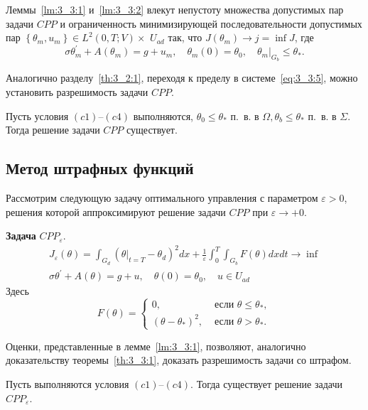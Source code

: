 Леммы~\ref{lm:3_3:1} и~\ref{lm:3_3:2} влекут
непустоту множества допустимых пар задачи $CPP$
и ограниченность минимизирующей последовательности допустимых пар
$\left\{\theta_{m}, u_{m}\right\} \in L^{2}(0, T ; V) \times$
$U_{a d}$ так, что $J\left(\theta_{m}\right) \rightarrow j=\inf J$, где
\begin{equation}
    \label{eq:3_3:5}
    \sigma \theta_{m}^{\prime}+A\left(\theta_{m}\right)=g+u_{m},
    \quad \theta_{m}(0)=\theta_{0},\left.\quad \theta_{m}\right|_{G_{b}} \leq \theta_{*}.
\end{equation}

Аналогично разделу~\ref{th:3_2:1}, переходя к пределу в системе~\eqref{eq:3_3:5},
можно установить разрешимость задачи $CPP$\@.

\begin{theorem}
    \label{th:3_3:1}
    Пусть условия $(c1)$--$(c4)$ выполняются,
    $\theta_{0} \leq \theta_{*}$ п.\ в. в $\Omega, \theta_{b} \leq \theta_{*}$ п.\ в. в $\Sigma$.
    Тогда решение задачи $CPP$ существует.
\end{theorem}

\subsection{Метод штрафных функций}\label{subsec:ch3:sec3:subsec4}
Рассмотрим следующую задачу оптимального управления с параметром $\varepsilon>0$,
решения которой аппроксимируют решение задачи $CPP$ при $\varepsilon \rightarrow+0$.


\textbf{Задача} $CPP_{\varepsilon}$.
\[
    \begin{gathered}
        J_{\varepsilon}(\theta)=\int_{G_{d}}
        \left(\left.\theta\right|_{t=T}
        -\theta_{d}\right)^{2} d x
        + \frac{1}{\varepsilon} \int_{0}^{T} \int_{G_{b}} F(\theta) d x d t \rightarrow \inf \\
        \sigma \theta^{\prime}+A(\theta)=g+u, \quad \theta(0)=\theta_{0}, \quad u \in U_{a d}
    \end{gathered}
\]
Здесь
\[
    F(\theta)=
    \begin{cases}
        0, & \text { если } \theta \leq \theta_{*}, \\
        \left(\theta-\theta_{*}\right)^{2}, & \text { если } \theta>\theta_{*}.
    \end{cases}
\]

Оценки, представленные в лемме~\ref{lm:3_3:1}, позволяют, аналогично
доказательству теоремы~\ref{th:3_3:1}, доказать разрешимость задачи со штрафом.
\begin{theorem}
    \label{th:3_3:2}
    Пусть выполняются условия $(c1)$--$(c4)$.
    Тогда существует решение задачи $CPP_{\varepsilon}$.
\end{theorem}


